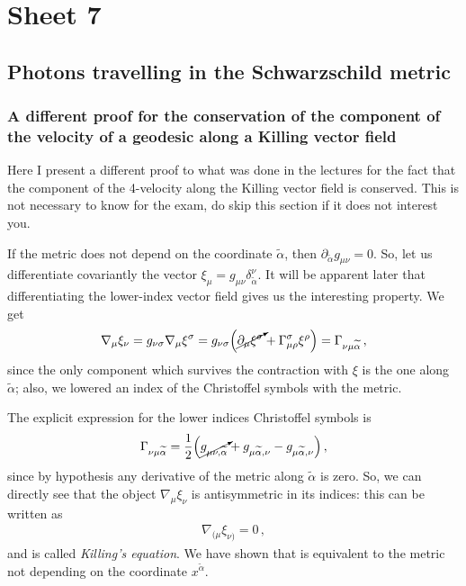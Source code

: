 \documentclass[main.tex]{subfiles}
\begin{document}
\section{Sheet 7}

\subsection{Photons travelling in the Schwarzschild metric}

\subsubsection{A different proof for the conservation of the component of the velocity of a geodesic along a Killing vector field}

Here I present a different proof to what was done in the lectures for the fact that the component of the 4-velocity along the Killing vector field is conserved. 
This is not necessary to know for the exam, do skip this section if it does not interest you. 

If the metric does not depend on the coordinate \(\widetilde{\alpha }\), then \(\partial_{\widetilde{\alpha }} g_{\mu \nu } = 0\). So, let us differentiate covariantly the vector \(\xi_{\mu } = g_{\mu \nu } \delta^{\nu}_{\widetilde{\alpha }}\).
It will be apparent later that differentiating the lower-index vector field gives us the interesting property.
We get 
%
\begin{align}
  \nabla_{\mu } \xi_{\nu } =
  g_{\nu \sigma } \nabla_{\mu } \xi^{\sigma }
  =  g_{\nu \sigma }
  \qty(\cancelto{}{\partial_{\mu } \xi^{\sigma }} + \Gamma^{\sigma }_{\mu \rho } \xi^{\rho })
  = \Gamma_{\nu \mu \widetilde{\alpha }}
\,,
\end{align}
%
since the only component which survives the contraction with \(\xi \) is the one along \(\widetilde{\alpha} \); also, we lowered an index of the Christoffel symbols with the metric. 

The explicit expression for the lower indices Christoffel symbols is 
%
\begin{align}
  \Gamma_{\nu \mu \widetilde{\alpha }}
  = \frac{1}{2} \qty(\cancelto{}{g_{\mu \nu , \widetilde{\alpha }}} +
  g_{\mu \widetilde{\alpha }, \nu }
  - g_{\mu \widetilde{\alpha }, \nu })
\,,
\end{align}
%
since by hypothesis any derivative of the metric along \(\widetilde{\alpha}\) is zero. So, we can directly see that the object \(\nabla_{\mu } \xi_{\nu }\) is antisymmetric in its indices: this can be written as 
%
\begin{align}
  \nabla_{(\mu } \xi_{\nu )} = 0
\,,
\end{align}
%
and is called \emph{Killing's equation}. We have shown that is equivalent to the metric not depending on the coordinate \(x^{\widetilde{\alpha}}\).
\end{document}
